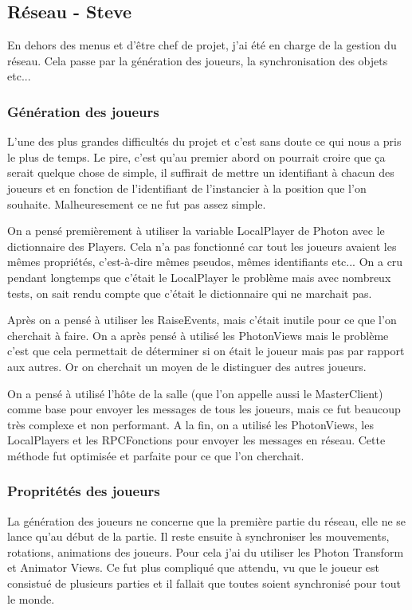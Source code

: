 \documentclass{article}
\begin{document}

\subsection{Réseau - Steve}
En dehors des menus et d'être chef de projet, j'ai été en charge de la gestion du réseau. Cela passe par la génération des joueurs, la synchronisation des objets 
etc...

\subsubsection{Génération des joueurs}

L'une des plus grandes difficultés du projet et c'est sans doute ce qui nous a pris le plus de temps. Le pire, c'est qu'au premier abord on pourrait croire que ça 
serait quelque chose de simple, il suffirait de mettre un identifiant à chacun des joueurs et en fonction de l'identifiant de l'instancier à la position que l'on 
souhaite. Malheuresement ce ne fut pas assez simple.

On a pensé premièrement à utiliser la variable LocalPlayer de Photon avec le dictionnaire des Players. Cela n'a 
pas fonctionné car tout les joueurs avaient les mêmes propriétés, c'est-à-dire mêmes pseudos, mêmes identifiants etc... On a cru pendant longtemps que c'était le 
LocalPlayer le problème mais avec nombreux tests, on sait rendu compte que c'était le dictionnaire qui ne marchait pas.

Après on a pensé à utiliser les RaiseEvents, mais c'était inutile pour ce que l'on cherchait à faire. On a après pensé à utilisé les PhotonViews mais le problème c'est 
que cela permettait de déterminer si on était le joueur mais pas par rapport aux autres. Or on cherchait un moyen de le distinguer des autres joueurs.

On a pensé à utilisé l'hôte de la salle (que l'on appelle aussi le MasterClient) comme base pour envoyer les messages de tous les joueurs, mais ce fut beaucoup très complexe et non 
performant. A la fin, on a utilisé les PhotonViews, les LocalPlayers et les RPCFonctions pour envoyer les messages en réseau. Cette méthode fut optimisée et parfaite 
pour ce que l'on cherchait.

\subsubsection{Propritétés des joueurs}
La génération des joueurs ne concerne que la première partie du réseau, elle ne se lance qu'au début de la partie. Il reste ensuite à synchroniser les mouvements, 
rotations, animations des joueurs. Pour cela j'ai du utiliser les Photon Transform et Animator Views. Ce fut plus compliqué que attendu, vu que le joueur est consistué 
de plusieurs parties et il fallait que toutes soient synchronisé pour tout le monde. 
\end{document}
